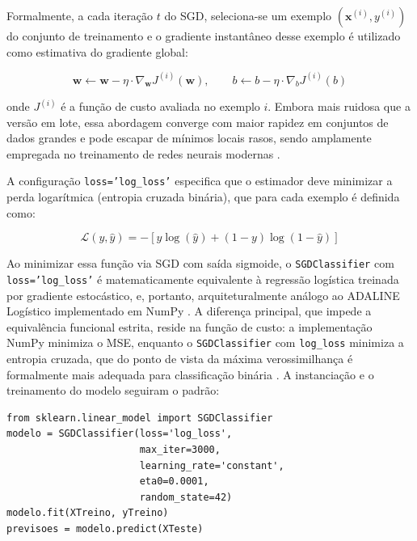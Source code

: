 Formalmente, a cada iteração $t$ do SGD, seleciona-se um exemplo $(\mathbf{x}^{(i)}, y^{(i)})$ do conjunto de treinamento e o gradiente instantâneo desse exemplo é utilizado como estimativa do gradiente global:

\begin{equation}
\mathbf{w} \leftarrow \mathbf{w} - \eta \cdot \nabla_{\mathbf{w}} J^{(i)}(\mathbf{w}), \qquad b \leftarrow b - \eta \cdot \nabla_b J^{(i)}(b)
\label{eq:sgd_update}
\end{equation}

onde $J^{(i)}$ é a função de custo avaliada no exemplo $i$. Embora mais ruidosa que a versão em lote, essa abordagem converge com maior rapidez em conjuntos de dados grandes e pode escapar de mínimos locais rasos, sendo amplamente empregada no treinamento de redes neurais modernas \cite{dsa2022}.

A configuração \texttt{loss='log\_loss'} especifica que o estimador deve minimizar a perda logarítmica (entropia cruzada binária), que para cada exemplo é definida como:

\begin{equation}
\mathcal{L}(y, \hat{y}) = -\left[ y \log(\hat{y}) + (1-y) \log(1-\hat{y}) \right]
\label{eq:logloss}
\end{equation}

Ao minimizar essa função via SGD com saída sigmoide, o \texttt{SGDClassifier} com \texttt{loss='log\_loss'} é matematicamente equivalente à regressão logística treinada por gradiente estocástico, e, portanto, arquiteturalmente análogo ao ADALINE Logístico implementado em NumPy \cite{braga2007}. A diferença principal, que impede a equivalência funcional estrita, reside na função de custo: a implementação NumPy minimiza o MSE, enquanto o \texttt{SGDClassifier} com \texttt{log\_loss} minimiza a entropia cruzada, que do ponto de vista da máxima verossimilhança é formalmente mais adequada para classificação binária \cite{silva2016}. A instanciação e o treinamento do modelo seguiram o padrão:

\begin{lstlisting}[caption={Instanciação e treinamento do ADALINE com biblioteca (SGDClassifier).}, label={lst:adaline_sklearn}]
from sklearn.linear_model import SGDClassifier
modelo = SGDClassifier(loss='log_loss',
                       max_iter=3000,
                       learning_rate='constant',
                       eta0=0.0001,
                       random_state=42)
modelo.fit(XTreino, yTreino)
previsoes = modelo.predict(XTeste)
\end{lstlisting}


